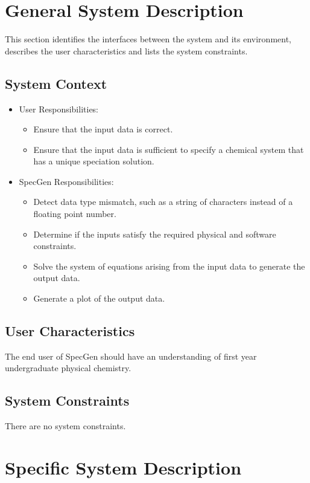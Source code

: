 \documentclass[12pt]{article}
\newcommand{\progname}{SpecGen} %
\begin{document}
\section{General System Description}
This section identifies the interfaces between the system and its environment,
describes the user characteristics and lists the system constraints.

\subsection{System Context}

\begin{itemize}
\item User Responsibilities:
\begin{itemize}
\item Ensure that the input data is correct.
\item Ensure that the input data is sufficient to specify a chemical system that has a unique speciation solution.
\end{itemize}
\item \progname{} Responsibilities:
\begin{itemize}
\item Detect data type mismatch, such as a string of characters instead of a
  floating point number.
\item Determine if the inputs satisfy the required physical and software constraints.
\item Solve the system of equations arising from the input data to generate the output data.
\item Generate a plot of the output data.
\end{itemize}
\end{itemize}

\subsection{User Characteristics} \label{SecUserCharacteristics}
The end user of \progname{} should have an understanding of first year undergraduate physical chemistry.

\subsection{System Constraints}
There are no system constraints.

\section{Specific System Description}
\end{document}
